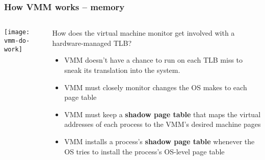 \begin{frame}[plain]
	\frametitle{How VMM works -- memory}
	
	
	
	\begin{columns}
		
		\begin{column}{.4\textwidth}
			\centering
			\texttt{[image: vmm-do-work]}
			
		\end{column}
		
		\begin{column}{.6\textwidth}
			
			 How does the virtual machine monitor get involved with a
			hardware-managed TLB?	
			
			\begin{itemize}
				\item VMM doesn't have a chance to run on each TLB miss to sneak its translation into the system. 
				\item VMM must closely monitor changes	the OS makes to each page table
				\item VMM must keep a \textbf{shadow page table} that maps the virtual addresses of each process to the VMM's desired machine pages
				\item VMM installs a process's \textbf{shadow page table }whenever the OS tries to install the process's	OS-level page table
				
			\end{itemize} 

			
			
		\end{column}
		
		
	\end{columns}
	
	
\end{frame}


